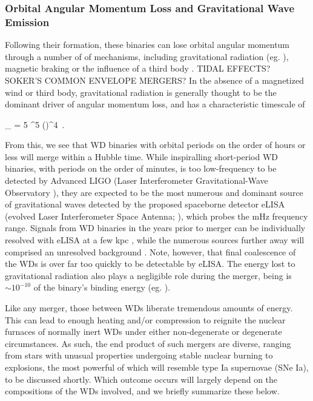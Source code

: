 \subsubsection{Orbital Angular Momentum Loss and Gravitational Wave Emission}

Following their formation, these binaries can lose orbital angular momentum through a number of of mechanisms, including gravitational radiation (eg. \citealt{XXX}), magnetic braking \citep{XXX} or the influence of a third body \citep{XXX}.  {\charles TIDAL EFFECTS?  SOKER'S COMMON ENVELOPE MERGERS?}  In the absence of a magnetized wind or third body, gravitational radiation is generally thought to be the dominant driver of angular momentum loss, and has a characteristic timescale of \citep{segrcm97}

\eqbegin
\tau_{} = 5 ^5 \left(\right)^4 \frac{\Msun}{\Ma} \frac{\Msun}{\Md} \frac{\Msun}{\Mtot}\,.
\label{eq:c1_gravtimescale}
\eqend

\noindent From this, we see that WD binaries with orbital periods on the order of hours or less will merge within a Hubble time.  While inspiralling short-period WD binaries, with periods on the order of minutes, is too low-frequency to be detected by Advanced LIGO (Laser Interferometer Gravitational-Wave Observatory \citealt{ligo+15}), they are expected to be the most numerous and dominant source of gravitational waves \citep{mars11} detected by the proposed spaceborne detector eLISA (evolved Laser Interferometer Space Antenna; \citealt{amar+13}), which probes the mHz frequency range.  Signals from WD binaries in the years prior to merger can be individually resolved with eLISA at a few kpc \citep{loreig09, dan+11}, while the numerous sources further away will comprised an unresolved background \cite{neleyp01,amar+13}.  Note, however, that final coalescence of the WDs is over far too quickly to be detectable by eLISA.  The energy lost to gravitational radiation also plays a negligible role during the merger, being is $\sim10^{-10}$ of the binary's binding energy (eg. \citealt{loreig09}).

Like any merger, those between WDs liberate tremendous amounts of energy.  This can lead to enough heating and/or compression to reignite the nuclear furnaces of normally inert WDs under either non-degenerate or degenerate circumstances.  As such, the end product of such mergers are diverse, ranging from stars with unusual properties undergoing stable nuclear burning to explosions, the most powerful of which will resemble type Ia supernovae (SNe Ia), to be discussed shortly.  Which outcome occurs will largely depend on the compositions of the WDs involved, and we briefly summarize these below.

